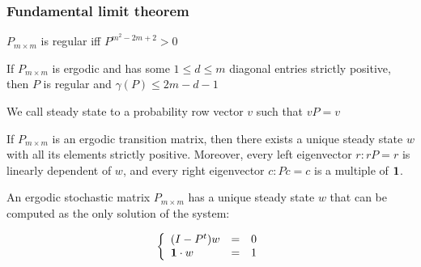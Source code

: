 \begin{frame} \frametitle{Fundamental limit theorem }
    \vspace{2em}
    \begin{corollary}
    \(P_{m \times m}\) is regular iff \(P^{m^2 - 2m + 2} > 0\)
    \end{corollary}

    \begin{lemma}
    If \(P_{m \times m}\) is ergodic and has some \(1 \le d \le m\) diagonal entries 
    strictly positive, then \(P\) is regular and \(\gamma(P) \le 2m - d - 1\)
    \end{lemma}
    
    \begin{definition}
    We call steady state to a probability row vector \(v\) such that \(vP = v\)
    \end{definition}
    
    \begin{theorem}

    If \(P_{m\times m}\) is an ergodic transition matrix, then there exists a unique steady state \(w\) with all its
    elements strictly positive. Moreover, every left eigenvector \(r: rP = r\) is linearly dependent of \(w\), and
    every right eigenvector \(c: Pc = c\) is a multiple of \(\mathbf{1}\).

    \label{th:steady-ergodic}
    \end{theorem}

    \begin{lemma}
    An ergodic stochastic matrix \(P_{m \times m}\) has a unique steady state \(w\) that can be computed as the
    only solution of the system:

    \[
    \left\{\begin{array}{lcl} (I - P^t)w & = & 0 \\ \mathbf{1} \cdot w & = & 1 \end{array}\right.
    \]
    \label{lemma:steady-states-computation}
    \end{lemma}

 \end{frame}
